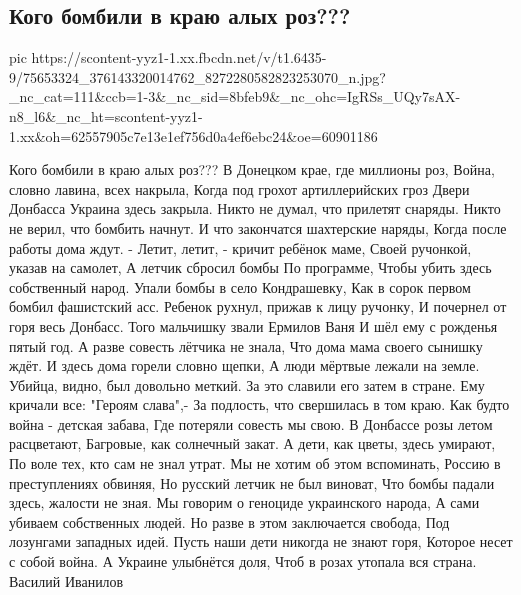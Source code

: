 
 
 
 
 

\subsection{Кого бомбили в краю алых роз???}


\ifcmt
  pic https://scontent-yyz1-1.xx.fbcdn.net/v/t1.6435-9/75653324_376143320014762_8272280582823253070_n.jpg?_nc_cat=111&ccb=1-3&_nc_sid=8bfeb9&_nc_ohc=IgRSs_UQy7sAX-n8_l6&_nc_ht=scontent-yyz1-1.xx&oh=62557905c7e13e1ef756d0a4ef6ebc24&oe=60901186
\fi

Кого бомбили в краю алых роз???
В Донецком крае, где миллионы роз,
Война, словно лавина, всех накрыла,
Когда под грохот артиллерийских гроз
Двери Донбасса Украина здесь закрыла.
Никто не думал, что прилетят снаряды.
Никто не верил, что бомбить начнут.
И что закончатся шахтерские наряды,
Когда после работы дома ждут.
- Летит, летит, - кричит ребёнок маме,
Своей ручонкой, указав на
самолет,
А летчик сбросил бомбы
По программе,
Чтобы убить здесь собственный народ.
Упали бомбы в село Кондрашевку, 
Как в сорок первом бомбил фашистский асс.
Ребенок рухнул, прижав к лицу ручонку,
И почернел от горя весь Донбасс.
Того мальчишку звали Ермилов Ваня
И шёл ему с рожденья пятый год.
А разве совесть лётчика не знала,
Что дома мама своего сынишку ждёт.
И здесь дома горели словно щепки,
А люди мёртвые лежали на земле.
Убийца, видно, был довольно меткий.
За это славили его затем в стране.
Ему кричали все: "Героям слава",-
За подлость, что свершилась в том краю.
Как будто война - детская забава,
Где потеряли совесть мы свою.
В Донбассе розы летом
расцветают,
Багровые, как солнечный закат.
А дети, как цветы, здесь умирают,
По воле тех, кто сам не знал утрат.
Мы не хотим об этом вспоминать, 
Россию в преступлениях обвиняя,
Но русский летчик не был виноват,
Что бомбы падали здесь, жалости не зная.
Мы говорим о геноциде украинского народа,
А сами убиваем собственных людей.
Но разве в этом заключается свобода,
Под лозунгами западных идей.
Пусть наши дети никогда не знают горя,
Которое несет с собой  война.
А Украине улыбнётся доля,
Чтоб в розах утопала вся страна.
Василий Иванилов


